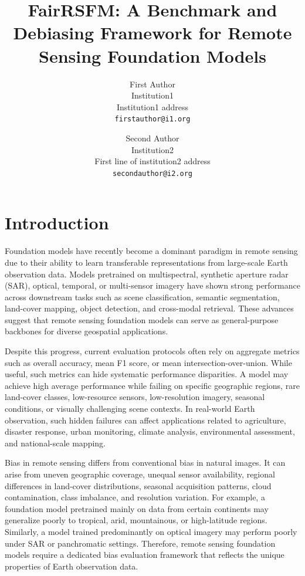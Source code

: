 \documentclass[10pt,twocolumn,letterpaper]{article}
\title{FairRSFM: A Benchmark and Debiasing Framework for Remote Sensing Foundation Models}
\author{First Author\\
Institution1\\
Institution1 address\\
{\tt\small firstauthor@i1.org}
\and
Second Author\\
Institution2\\
First line of institution2 address\\
{\tt\small secondauthor@i2.org}
}
\begin{document}
\maketitle

    


\section{Introduction}

Foundation models have recently become a dominant paradigm in remote sensing due to their ability to learn transferable representations from large-scale Earth observation data. Models pretrained on multispectral, synthetic aperture radar (SAR), optical, temporal, or multi-sensor imagery have shown strong performance across downstream tasks such as scene classification, semantic segmentation, land-cover mapping, object detection, and cross-modal retrieval. These advances suggest that remote sensing foundation models can serve as general-purpose backbones for diverse geospatial applications.

Despite this progress, current evaluation protocols often rely on aggregate metrics such as overall accuracy, mean F1 score, or mean intersection-over-union. While useful, such metrics can hide systematic performance disparities. A model may achieve high average performance while failing on specific geographic regions, rare land-cover classes, low-resource sensors, low-resolution imagery, seasonal conditions, or visually challenging scene contexts. In real-world Earth observation, such hidden failures can affect applications related to agriculture, disaster response, urban monitoring, climate analysis, environmental assessment, and national-scale mapping.

Bias in remote sensing differs from conventional bias in natural images. It can arise from uneven geographic coverage, unequal sensor availability, regional differences in land-cover distributions, seasonal acquisition patterns, cloud contamination, class imbalance, and resolution variation. For example, a foundation model pretrained mainly on data from certain continents may generalize poorly to tropical, arid, mountainous, or high-latitude regions. Similarly, a model trained predominantly on optical imagery may perform poorly under SAR or panchromatic settings. Therefore, remote sensing foundation models require a dedicated bias evaluation framework that reflects the unique properties of Earth observation data.
\end{document}
